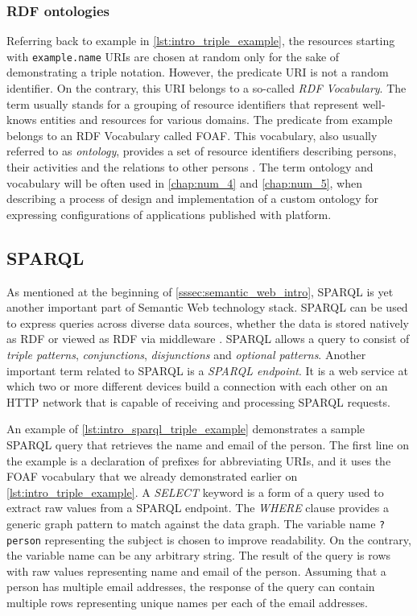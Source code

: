\subsubsection{RDF ontologies}

Referring back to example in \autoref{lst:intro_triple_example}, the resources starting with \texttt{example.name} URIs are chosen at random only for the sake of demonstrating a triple notation. However, the predicate URI is not a random identifier. On the contrary, this URI belongs to a so-called \textit{RDF Vocabulary}. The term usually stands for a grouping of resource identifiers that represent well-knows entities and resources for various domains. The predicate from example belongs to an RDF Vocabulary called \acrfull{FOAF}. This vocabulary, also usually referred to as \textit{ontology}, provides a set of resource identifiers describing persons, their activities and the relations to other persons \cite{foaf}. The term ontology and vocabulary will be often used in \autoref{chap:num_4} and \autoref{chap:num_5}, when describing a process of design and implementation of a custom ontology for expressing configurations of applications published with \lpa{} platform.

\subsection{SPARQL}

As mentioned at the beginning of \autoref{sssec:semantic_web_intro}, SPARQL is yet another important part of Semantic Web technology stack. SPARQL can be used to express queries across diverse data sources, whether the data is stored natively as RDF or viewed as RDF via middleware \cite{sparql_main_spec}\cite{sparql_specs}. SPARQL allows a query to consist of \textit{triple patterns}, \textit{conjunctions}, \textit{disjunctions} and \textit{optional patterns}. Another important term related to SPARQL is a \textit{SPARQL endpoint}. It is a web service at which two or more different devices build a connection with each other on an HTTP network that is capable of receiving and processing SPARQL requests.

An example of \autoref{lst:intro_sparql_triple_example} demonstrates a sample SPARQL query that retrieves the name and email of the person. The first line on the example is a declaration of prefixes for abbreviating URIs, and it uses the FOAF vocabulary that we already demonstrated earlier on \autoref{lst:intro_triple_example}. A \textit{SELECT} keyword is a form of a query used to extract raw values from a SPARQL endpoint. The \textit{WHERE} clause provides a generic graph pattern to match against the data graph. The variable name \texttt{?person} representing the subject is chosen to improve readability. On the contrary, the variable name can be any arbitrary string. The result of the query is rows with raw values representing name and email of the person. Assuming that a person has multiple email addresses, the response of the query can contain multiple rows representing unique names per each of the email addresses. 

